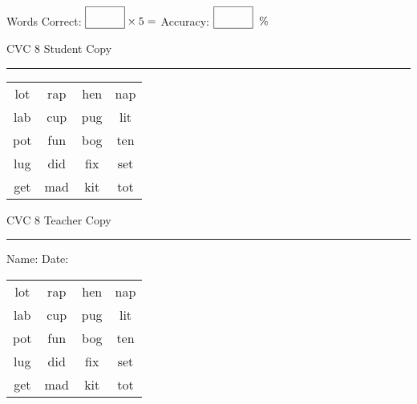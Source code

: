 \documentclass{memoir}
\begin{document}
\small

Words Correct: $\fbox{\phantom{\huge 100}} \times 5 = $ Accuracy: $\fbox{\phantom{\huge 100}}\;\; \%$ 

\vfill

\newpage


\footnotesize \noindent
CVC 8 \hfill Student Copy
\smallskip
\hrule

\Large

\setlength{\tabcolsep}{14pt}
\def\arraystretch{2}

{\selectfont


\begin{vplace}[0.5]
\begin{center}
\begin{tabular}{cccc}
lot & rap & hen & nap \\
lab & cup & pug & lit \\
pot & fun & bog & ten \\
lug & did & fix & set \\
get & mad & kit & tot \\
\end{tabular}
\end{center}
\end{vplace}

}

\newpage

\footnotesize \noindent
CVC 8 \hfill Teacher Copy
\smallskip
\hrule

\small

\vfill

\noindent
Name: \underline{\hspace{1.75in}} \hfill Date: \underline{\hspace{1in}}

\Large

{\selectfont


\begin{vplace}[0.5]
\begin{center}
\begin{tabular}{cccc}
lot & rap & hen & nap \\
lab & cup & pug & lit \\
pot & fun & bog & ten \\
lug & did & fix & set \\
get & mad & kit & tot \\
\end{tabular}
\end{center}
\end{vplace}



}
\end{document}
